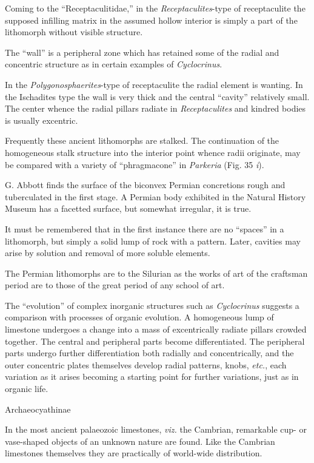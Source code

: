 \documentclass[a4paper, 12pt, oneside]{article}
\begin{document}
Coming to the ``Receptaculitidae,'' in the \emph{Receptaculites}-type of receptaculite the supposed infilling matrix in the assumed hollow interior is simply a part of the lithomorph without visible structure.

The ``wall'' is a peripheral zone which has retained some of the radial and concentric structure as in certain examples of \emph{Cyclocrinus}.

In the \emph{Polygonosphaerites}-type of receptaculite the radial element is wanting. In the Ischadites type the wall is very thick and the central ``cavity'' relatively small. The center whence the radial pillars radiate in \emph{Receptaculites} and kindred bodies is usually excentric.

Frequently these ancient lithomorphs are stalked. The continuation of the homogeneous stalk structure into the interior point whence radii originate, may be compared with a variety of ``phragmacone'' in \emph{Parkeria} (Fig. 35 \emph{i}).

G. Abbott finds the surface of the biconvex Permian concretions rough and tuberculated in the first stage. A Permian body exhibited in the Natural History Museum has a facetted surface, but somewhat irregular, it is true.

It must be remembered that in the first instance there are no ``spaces'' in a lithomorph, but simply a solid lump of rock with a pattern. Later, cavities may arise by solution and removal of more soluble elements.

The Permian lithomorphs are to the Silurian as the works of art of the craftsman period are to those of the great period of any school of art.

The ``evolution'' of complex inorganic structures such as \emph{Cyclocrinus} suggests a comparison with processes of organic evolution. A homogeneous lump of limestone undergoes a change into a mass of excentrically radiate pillars crowded together. The central and peripheral parts become differentiated. The peripheral parts undergo further differentiation both radially and concentrically, and the outer concentric plates themselves develop radial patterns, knobs, \emph{etc.}, each variation as it arises becoming a starting point for further variations, just as in organic life.

Archaeocyathinae

In the most ancient palaeozoic limestones, \emph{viz.} the Cambrian, remarkable cup- or vase-shaped objects of an unknown nature are found. Like the Cambrian limestones themselves they are practically of world-wide distribution.
\end{document}

